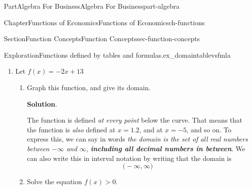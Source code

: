 \documentclass[oneside,10pt,]{tufte-book}
\newcommand{\blocktitlefont}{\relax}
\newcommand{\alert}[1]{\textbf{\textit{#1}}}
\numberwithin{equation}{chapter}
\begin{document}
\begin{partptx}{Part}{Algebra For Business}{}{Algebra For Business}{}{}{part-algebra}
\begin{chapterptx}{Chapter}{Functions of Economics}{}{Functions of Economics}{}{}{ch-functions}
\begin{sectionptx}{Section}{Function Concepts}{}{Function Concepts}{}{}{sec-function-concepts}
\begin{exploration}{Exploration}{Functions defined by tables and formulas.}{ex_domaintablevsfmla}
\begin{enumerate}[font=\bfseries,label=(\alph*),ref=\alph*]
\begin{enumerate}[font=\bfseries,label=(\roman*),ref=\theenumi.\roman*]
\begin{image}{0.25}{0.5}{0.25}{}
{
}%
\end{image}%
\item{}Evaluate \(f(z)\) where \(z=3\)%
\par\smallskip%
\noindent\textbf{\blocktitlefont Solution}.\hypertarget{ex_domaintablevsfmla-3-4-2}{}\quad{}\(f(3)=7\)%
\item{}Solve \(f(z)=3\)%
\par\smallskip%
\noindent\textbf{\blocktitlefont Solution}.\hypertarget{ex_domaintablevsfmla-3-5-2}{}\quad{}\(f(5) = 3\), so the solution is \(z=5\)%
\end{enumerate}%
\item{}Let \(f(x) = -2x +13\)%
\begin{enumerate}[font=\bfseries,label=(\roman*),ref=\theenumi.\roman*]%
\item{}Graph this function, and give its domain.%
\par\smallskip%
\noindent\textbf{\blocktitlefont Solution}.\hypertarget{ex_domaintablevsfmla-4-2-2}{}\quad{}%
\begin{image}{0.25}{0.5}{0.25}{}%
%
\end{image}%
The function is defined \emph{at every point} below the curve.  That means that the function is \emph{also} defined at \(x=1.2\), and at \(x=-5\), and so on. To express this, we can say in words \emph{the domain is the set of all real numbers between \(-\infty\) and \(\infty\)}, \alert{including all decimal numbers in between}. We can also write this in interval notation by writing that the domain is%
\begin{equation*}
\Big(-\infty, \infty\Big)
\end{equation*}
%
\item{}Solve the equation \(f(x)>0\).%
\par\smallskip%

\end{enumerate}
\end{enumerate}
\end{exploration}
\end{sectionptx}
\end{chapterptx}
\end{partptx}
\end{document}
